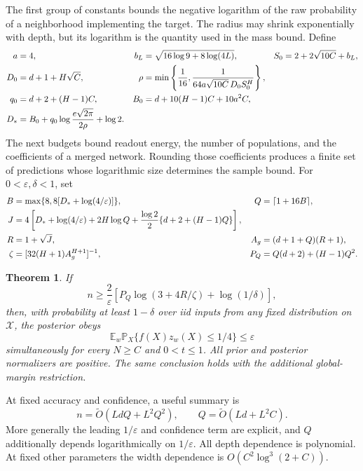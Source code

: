 \documentclass[11pt]{article}
\newtheorem{theorem}{Theorem}
\newcommand{\E}{\mathbb E}\newcommand{\Prb}{\mathbb P}
\begin{document}
The first group of constants bounds the negative logarithm of the raw probability of a neighborhood implementing the target. The radius may shrink exponentially with depth, but its logarithm is the quantity used in the mass bound. Define
\begin{align}
 a&=4,&b_L&=\sqrt{16\log9+8\log(4L)},&S_0&=2+2\sqrt{10C}+b_L,\notag\\
 D_0&=d+1+H\sqrt C,&\rho&=\min\left\{\frac1{16},\frac1{64a\sqrt{10C}\,D_0S_0^H}\right\},\notag\\
 q_0&=d+2+(H-1)C,&B_0&=d+10(H-1)C+10a^2C,\notag\\
 D_*&=B_0+q_0\log\frac{e\sqrt{2\pi}}{2\rho}+\log2.
 \label{eq:target}
\end{align}
The next budgets bound readout energy, the number of populations, and the coefficients of a merged network. Rounding those coefficients produces a finite set of predictions whose logarithmic size determines the sample bound. For $0<\varepsilon,\delta<1$, set
\begin{align}
 B&=\max\{8,8[D_*+\log(4/\varepsilon)]\},&Q&=\lceil1+16B\rceil,\notag\\
 J&=4\left[D_*+\log(4/\varepsilon)+2H\log Q
 +\frac{\log2}{2}\{d+2+(H-1)Q\}\right],\notag\\
 R&=1+\sqrt J,&A_g&=(d+1+Q)(R+1),\notag\\
 \zeta&=[32(H+1)A_g^{H+1}]^{-1},&P_Q&=Q(d+2)+(H-1)Q^2.
 \label{eq:budget}
\end{align}
\begin{theorem}\label{thm:main}
If
\begin{equation}\label{eq:sample}
 n\ge\frac2\varepsilon\left[P_Q\log(3+4R/\zeta)+\log(1/\delta)\right],
\end{equation}
then, with probability at least $1-\delta$ over iid inputs from any fixed distribution on $\mathcal X$, the posterior obeys
\[
 \E_w\Prb_X\{f(X)z_w(X)\le1/4\}\le\varepsilon
\]
simultaneously for every $N\ge C$ and $0<t\le1$. All prior and posterior normalizers are positive. The same conclusion holds with the additional global-margin restriction.
\end{theorem}
At fixed accuracy and confidence, a useful summary is
\[
 n=\widetilde O(LdQ+L^2Q^2),\qquad Q=\widetilde O(Ld+L^2C).
\]
More generally the leading $1/\varepsilon$ and confidence term are explicit, and $Q$ additionally depends logarithmically on $1/\varepsilon$. All depth dependence is polynomial. At fixed other parameters the width dependence is $O(C^2\log^3(2+C))$.
\end{document}
